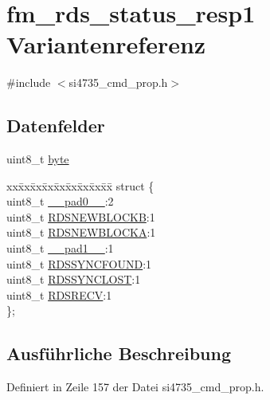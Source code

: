 \hypertarget{unionfm__rds__status__resp1}{}\section{fm\+\_\+rds\+\_\+status\+\_\+resp1 Variantenreferenz}
\label{unionfm__rds__status__resp1}


{\ttfamily \#include $<$si4735\+\_\+cmd\+\_\+prop.\+h$>$}

\subsection*{Datenfelder}
\begin{DoxyCompactItemize}
\item 
uint8\+\_\+t \hyperlink{unionfm__rds__status__resp1_a96f44d20f1dbf1c8785a7bc99a46164c}{byte}
\item 
\begin{tabbing}
xx\=xx\=xx\=xx\=xx\=xx\=xx\=xx\=xx\=\kill
struct \{\\
\>uint8\_t \hyperlink{unionfm__rds__status__resp1_a8b4eebe79ded0459acec2f4950102ba3}{\_\_pad0\_\_}:2\\
\>uint8\_t \hyperlink{unionfm__rds__status__resp1_acd71c83a87b1a99a4784dad5f2a9477f}{RDSNEWBLOCKB}:1\\
\>uint8\_t \hyperlink{unionfm__rds__status__resp1_a62260ece65dc68c2467e5e1b09e5f144}{RDSNEWBLOCKA}:1\\
\>uint8\_t \hyperlink{unionfm__rds__status__resp1_a77f12d2e278bd5c07712648ac0df5e08}{\_\_pad1\_\_}:1\\
\>uint8\_t \hyperlink{unionfm__rds__status__resp1_a924e0044d60c0d490d165ceb3ef6b23d}{RDSSYNCFOUND}:1\\
\>uint8\_t \hyperlink{unionfm__rds__status__resp1_a73c3d34273c45dd08fcb341496c08052}{RDSSYNCLOST}:1\\
\>uint8\_t \hyperlink{unionfm__rds__status__resp1_a56e25cd5c95053ebd95c3c35654680d6}{RDSRECV}:1\\
\}; \\

\end{tabbing}\end{DoxyCompactItemize}


\subsection{Ausführliche Beschreibung}


Definiert in Zeile 157 der Datei si4735\+\_\+cmd\+\_\+prop.\+h.



